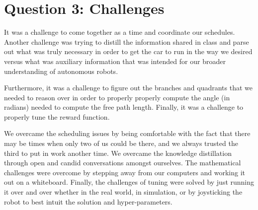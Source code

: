 \section{Question 3: Challenges} 

It was a challenge to come together as a time and coordinate our schedules. Another challenge was trying to distill the information shared in class and parse out what was truly necessary in order to get the car to run in the way we desired versus what was auxiliary information that was intended for our broader understanding of autonomous robots. 

Furthermore, it was a challenge to figure out the branches and quadrants that we needed to reason over in order to properly properly compute the angle (in radians) needed to compute the free path length. Finally, it was a challenge to properly tune the reward function. 

We overcame the scheduling issues by being comfortable with the fact that there may be times when only two of us could be there, and we always trusted the third to put in work another time. We overcame the knowledge distillation through open and candid conversations amongst ourselves. The mathematical challenges were overcome by stepping away from our computers and working it out on a whiteboard. Finally, the challenges of tuning were solved by just running it over and over whether in the real world, in simulation, or by joysticking the robot to best intuit the solution and hyper-parameters. 